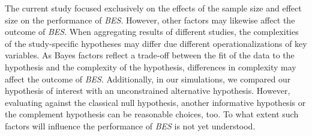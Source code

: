 \documentclass[]{interact}
\theoremstyle{plain}%
\theoremstyle{definition}
\theoremstyle{remark}
\begin{document}
The current study focused exclusively on the effects of the sample size
and effect size on the performance of \emph{BES}. However, other factors
may likewise affect the outcome of \emph{BES}. When aggregating results
of different studies, the complexities of the study-specific hypotheses
may differ due different operationalizations of key variables. As Bayes
factors reflect a trade-off between the fit of the data to the
hypothesis and the complexity of the hypothesis, differences in
complexity may affect the outcome of \emph{BES}. Additionally, in our
simulations, we compared our hypothesis of interest with an
unconstrained alternative hypothesis. However, evaluating against the
classical null hypothesis, another informative hypothesis or the
complement hypothesis can be reasonable choices, too. To what extent
such factors will influence the performance of \emph{BES} is not yet
understood.



\end{document}
